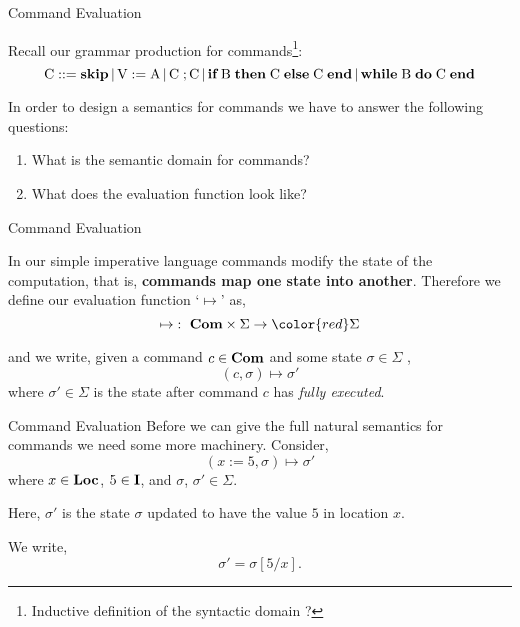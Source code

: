 \documentclass{beamer}
\begin{document}
\begin{frame}{Command Evaluation}

Recall our grammar production for commands\footnote{\tiny Inductive definition of the syntactic domain ?}:
\[
\mbox{C} ::= \mbox{\bf skip} \,|\, \mbox{V} := \mbox{A} \,|\,\mbox{C}\; ; \mbox{C} \,|\,
	\mbox{\bf if} \; \mbox{B}\; \mbox{\bf then}\;\mbox{C}\; \mbox{\bf else}\; \mbox{C} \; \mbox{\bf end}\,|\,
	\mbox{\bf while}\; \mbox{B}\; \mbox{\bf  do}\; \mbox{C}\; \mbox{\bf end}
\]

In order to design a semantics for commands we have to answer the following questions:
\begin{enumerate}
\item What is the semantic domain for commands?
\item  What does the evaluation function
look like?
\end{enumerate}
\end{frame}


\begin{frame}{Command Evaluation}

In our simple imperative language commands modify the state of the computation, that is,
{\bf commands map one state into another}.  Therefore we define
our evaluation function `$\mapsto$' as,
\[
\mapsto \co \syntaxset{Com} \times \Sigma\rightarrow {\color{red}\Sigma}
\]

and we write, given a command $c \in \mbox{\bf Com}$ and some state $\sigma \in \Sigma$ ,
\[
( c, \sigma ) \mapsto \sigma'
\]
where $\sigma' \in \Sigma$ is the state after command $c$ has {\em fully executed}.
\end{frame}


\begin{frame}{Command Evaluation}
Before we can give the full natural semantics for commands we need some more
machinery.  Consider,
\[
( x := 5, \sigma ) \mapsto \sigma'
\]
where $x \in \mbox{\bf Loc}$, $5 \in \mbox{\bf I}$, and $\sigma$, $\sigma' \in \Sigma$.

\vspace{.1in}

Here, $\sigma'$ is the state $\sigma$ updated to have the value $5$ in location $x$.

We write,
\[
\sigma' = \sigma[5/x].
\]

\end{frame}
\end{document}
